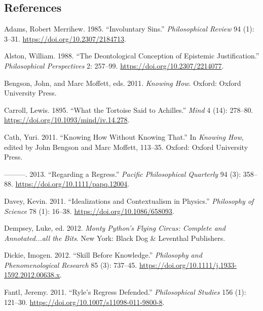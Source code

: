 \documentclass[
  11pt,
  letterpaper,
  DIV=11,
  numbers=noendperiod,
  oneside]{scrartcl}
\newlength{\cslhangindent}
\newenvironment{CSLReferences}[2] %
 {\begin{list}{}{%
  \setlength{\itemindent}{0pt}
  \setlength{\leftmargin}{0pt}
  \setlength{\parsep}{0pt}
  \ifodd #1
   \setlength{\leftmargin}{\cslhangindent}
   \setlength{\itemindent}{-1\cslhangindent}
  \fi
  \setlength{\itemsep}{#2\baselineskip}}}
 {\end{list}}
\begin{document}
\subsection*{References}\label{references}

\label{refs}
\begin{CSLReferences}{1}{0}
Adams, Robert Merrihew. 1985. {``Involuntary Sins.''}
\emph{Philosophical Review} 94 (1): 3--31.
\url{https://doi.org/10.2307/2184713}.

Alston, William. 1988. {``The Deontological Conception of Epistemic
Justification.''} \emph{Philosophical Perspectives} 2: 257--99.
\url{https://doi.org/10.2307/2214077}.

Bengson, John, and Marc Moffett, eds. 2011. \emph{Knowing How}. Oxford:
Oxford University Press.

Carroll, Lewis. 1895. {``What the Tortoise Said to Achilles.''}
\emph{Mind} 4 (14): 278--80.
\url{https://doi.org/10.1093/mind/iv.14.278}.

Cath, Yuri. 2011. {``Knowing How Without Knowing That.''} In
\emph{Knowing How}, edited by John Bengson and Marc Moffett, 113--35.
Oxford: Oxford University Press.

---------. 2013. {``Regarding a Regress.''} \emph{Pacific Philosophical
Quarterly} 94 (3): 358--88. \url{https://doi.org/10.1111/papq.12004}.

Davey, Kevin. 2011. {``Idealizations and Contextualism in Physics.''}
\emph{Philosophy of Science} 78 (1): 16--38.
\url{https://doi.org/10.1086/658093}.

Dempsey, Luke, ed. 2012. \emph{Monty Python's Flying Circus: Complete
and Annotated...all the Bits}. New York: Black Dog \& Leventhal
Publishers.

Dickie, Imogen. 2012. {``Skill Before Knowledge.''} \emph{Philosophy and
Phenomenological Research} 85 (3): 737--45.
\url{https://doi.org/10.1111/j.1933-1592.2012.00638.x}.

Fantl, Jeremy. 2011. {``Ryle's Regress Defended.''} \emph{Philosophical
Studies} 156 (1): 121--30.
\url{https://doi.org/10.1007/s11098-011-9800-8}.


\end{CSLReferences}
\end{document}

